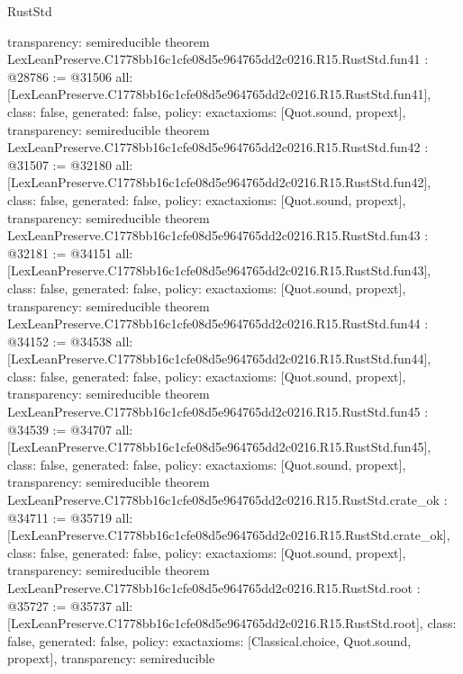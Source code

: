 \begin{lexlean}{RustStd}
\begin{coremodule}
{  transparency: semireducible
}
theorem LexLeanPreserve.C1778bb16c1cfe08d5e964765dd2c0216.R15.RustStd.fun41 : @28786 := @31506 {
  all: [LexLeanPreserve.C1778bb16c1cfe08d5e964765dd2c0216.R15.RustStd.fun41],
  class: false,
  generated: false,
  policy: exact{axioms: [Quot.sound, propext]},
  transparency: semireducible
}
theorem LexLeanPreserve.C1778bb16c1cfe08d5e964765dd2c0216.R15.RustStd.fun42 : @31507 := @32180 {
  all: [LexLeanPreserve.C1778bb16c1cfe08d5e964765dd2c0216.R15.RustStd.fun42],
  class: false,
  generated: false,
  policy: exact{axioms: [Quot.sound, propext]},
  transparency: semireducible
}
theorem LexLeanPreserve.C1778bb16c1cfe08d5e964765dd2c0216.R15.RustStd.fun43 : @32181 := @34151 {
  all: [LexLeanPreserve.C1778bb16c1cfe08d5e964765dd2c0216.R15.RustStd.fun43],
  class: false,
  generated: false,
  policy: exact{axioms: [Quot.sound, propext]},
  transparency: semireducible
}
theorem LexLeanPreserve.C1778bb16c1cfe08d5e964765dd2c0216.R15.RustStd.fun44 : @34152 := @34538 {
  all: [LexLeanPreserve.C1778bb16c1cfe08d5e964765dd2c0216.R15.RustStd.fun44],
  class: false,
  generated: false,
  policy: exact{axioms: [Quot.sound, propext]},
  transparency: semireducible
}
theorem LexLeanPreserve.C1778bb16c1cfe08d5e964765dd2c0216.R15.RustStd.fun45 : @34539 := @34707 {
  all: [LexLeanPreserve.C1778bb16c1cfe08d5e964765dd2c0216.R15.RustStd.fun45],
  class: false,
  generated: false,
  policy: exact{axioms: [Quot.sound, propext]},
  transparency: semireducible
}
theorem LexLeanPreserve.C1778bb16c1cfe08d5e964765dd2c0216.R15.RustStd.crate_ok : @34711 := @35719 {
  all: [LexLeanPreserve.C1778bb16c1cfe08d5e964765dd2c0216.R15.RustStd.crate_ok],
  class: false,
  generated: false,
  policy: exact{axioms: [Quot.sound, propext]},
  transparency: semireducible
}
theorem LexLeanPreserve.C1778bb16c1cfe08d5e964765dd2c0216.R15.RustStd.root : @35727 := @35737 {
  all: [LexLeanPreserve.C1778bb16c1cfe08d5e964765dd2c0216.R15.RustStd.root],
  class: false,
  generated: false,
  policy: exact{axioms: [Classical.choice, Quot.sound, propext]},
  transparency: semireducible
}


\end{coremodule}
\end{lexlean}
